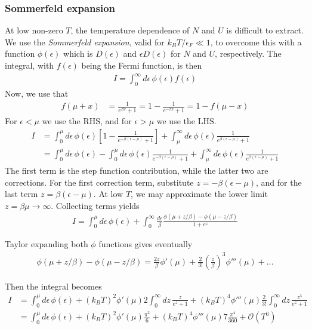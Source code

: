 \documentclass[a4paper, english, 12pt]{article}
\newcommand{\eps}{\epsilon}
\newcommand{\closed}[1]{\left( #1 \right)}
\newcommand{\bracket}[1]{\left[ #1 \right]}
\begin{document}
\begin{multicols*}{2}
\subsubsection*{\scriptsize Sommerfeld expansion}
At low non-zero $T$, the temperature dependence of $N$ and $U$ is difficult to extract. We use the \textit{Sommerfeld expansion}, valid for $k_B T/\eps_F\ll1$, to overcome this with a function $\phi(\eps)$ which is $D(\eps)$ and $\eps D(\eps)$ for $N$ and $U$, respectively. The integral, with $f(\eps)$ being the Fermi function, is then 
\begin{align*}
    I = \int_0^\infty d\eps\, \phi(\eps) f(\eps)     
\end{align*}
Now, we use that  
\begin{align*}
    f(\mu+x) &= \frac{1}{e^{\beta x}+1} = 1 - \frac{1}{e^{-\beta x}+1} = 1-f(\mu-x)
\end{align*}
For $\eps<\mu$ we use the RHS, and for $\eps>\mu$ we use the LHS.
\begin{align*}
    I &= \int_0^\mu d\eps\, \phi(\eps)\bracket{1-\frac{1}{e^{-\beta(\eps-\mu)} +1 }} + \int_\mu^\infty d\eps\, \phi(\eps) \frac{1}{e^{\beta(\eps-\mu)} +1} \\ 
    &=\int_0^\mu d\eps\, \phi(\eps) - \int_0^\mu d\eps\, \phi(\eps)\frac{1}{e^{-\beta(\eps-\mu)} +1 } + \int_\mu^\infty d\eps\, \phi(\eps) \frac{1}{e^{\beta(\eps-\mu)} +1}
\end{align*}
The first term is the step function contribution, while the latter two are corrections. For the first correction term, substitute $z=-\beta(\eps-\mu)$, and for the last term $z=\beta(\eps-\mu)$. At low $T$, we may approximate the lower limit $z=\beta\mu\to\infty$. Collecting terms yields 
\begin{align*}
    I=\int_0^\mu d\eps\, \phi(\eps) + \int_0^\infty \frac{d\eps}{\beta} \frac{\phi(\mu+z/\beta) - \phi(\mu-z/\beta)}{1+e^z} 
\end{align*}

Taylor expanding both $\phi$ functions gives eventually 
\begin{align*}
    \phi(\mu+z/\beta) - \phi(\mu-z/\beta) = \frac{2z}{\beta}\phi'(\mu) + \frac{2}{3!}\closed{\frac{z}{\beta}}^3 \phi'''(\mu)+...
\end{align*} 

Then the integral becomes 
\begin{align*}
    I &= \int_0^\mu d\eps\, \phi(\eps) + (k_B T)^2 \phi'(\mu) 2 \int_{0}^\infty dz\, \frac{z}{e^z+1} + (k_B T)^4 \phi'''(\mu) \frac{2}{3!} \int_0^\infty dz\, \frac{z^3}{e^z+1} \\ 
    &= \int_0^\mu d\eps\, \phi(\eps) + (k_B T)^2 \phi'(\mu) \frac{\pi^2}{6} + (k_B T)^4 \phi'''(\mu) 7 \frac{\pi^4}{360} + \mathcal{O}(T^6)
\end{align*}


\end{multicols*}
\end{document}
